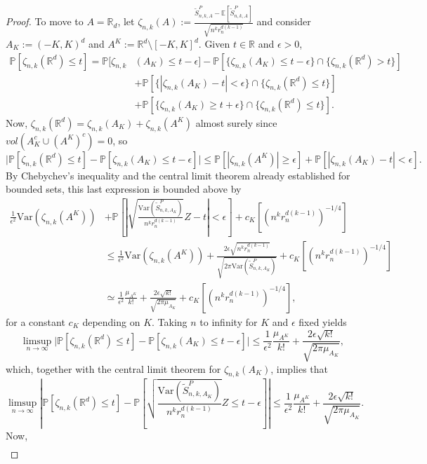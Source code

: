 \documentclass{amsart}
\theoremstyle{definition}
\newcommand{\R}{\mathbb{R}}
\newcommand{\E}{\mathbb{E}}
\renewcommand{\P}{\mathbb{P}}
\newcommand{\var}{\mathrm{Var}}
\newcommand{\s}{\widetilde{S}}
\renewcommand{\1}{\mathbb{1}}
\begin{document}
\begin{proof}
To move to $A=\R_d$, let $\zeta_{n,k}(A):=\frac{\s_{n,k,A}^P
-\E[\s_{n,k,A}^P]}{\sqrt{n^kr_n^{d(k-1)}}}$ and consider $A_K:=(-K,K)^d$
and $A^K:=\R^d\setminus[-K,K]^d.$  Given $t\in\R$ and $\epsilon>0$,
\begin{equation*}\begin{split}
\P[\zeta_{n,k}(\R^d)\le t]=\P[\zeta_{n,k}&(A_K)\le t-\epsilon]-\P[\{\zeta_{n,k}(A_K)
\le t-\epsilon\}\cap\{\zeta_{n,k}(\R^d)>t\}]\\&
+\P[\{|\zeta_{n,k}(A_K)-t|<\epsilon
\}\cap\{\zeta_{n,k}(\R^d)\le t\}]\\&+\P[\{\zeta_{n,k}(A_K)\ge t+\epsilon\}\cap\{
\zeta_{n,k}(\R^d)\le t\}].
\end{split}\end{equation*}
Now, $\zeta_{n,k}(\R^d)=\zeta_{n,k}(A_K)+\zeta_{n,k}(A^K)$ almost surely since
$vol(A_K^c\cup (A^K)^c)=0$, so 
$$\big|\P[\zeta_{n,k}(\R^d)\le t]-\P[\zeta_{n,k}(A_K)\le t-\epsilon]\big|\le
\P[|\zeta_{n,k}(A^K)|\ge\epsilon]+\P[|\zeta_{n,k}(A_K)-t|<\epsilon].$$
By Chebychev's inequality and the central limit theorem already
established for bounded sets, this last expression is bounded above by 
\begin{equation*}\begin{split}
\frac{1}{\epsilon^2}\var(\zeta_{n,k}(A^K))&+
\P\left[\left|\sqrt{\frac{\var(\s_{n,k,A_K}^P)}{n^kr_n^{d(k-1)}}}Z-t\right|<
\epsilon\right]+c_K\left[(n^kr_n^{d(k-1)})^{-1/4}\right]\\&\le
\frac{1}{\epsilon^2}\var(\zeta_{n,k}(A^K))+\frac{2\epsilon\sqrt{
n^kr_n^{d(k-1)}}}{\sqrt{2\pi\var(\s_{n,k,A_K}^P)}}+c_K\left[(n^kr_n^{d(k
-1)})^{-1/4}\right]\\&\simeq \frac{1}{\epsilon^2}\frac{\mu_{A^K}}{k!}
+\frac{2\epsilon\sqrt{k!}}{\sqrt{2\pi\mu_{A_K}}}+c_K\left[(n^kr_n^{d(k
-1)})^{-1/4}\right],
\end{split}\end{equation*}
for a constant $c_K$ depending on $K$.  
Taking $n$ to infinity for $K$ and $\epsilon$ fixed yields
$$\limsup_{n\to\infty}\big|\P[\zeta_{n,k}(\R^d)\le t]-\P[\zeta_{n,k}(A_K)\le 
t-\epsilon]\big|\le \frac{1}{\epsilon^2}\frac{\mu_{A^K}}{k!}
+\frac{2\epsilon\sqrt{k!}}{\sqrt{2\pi\mu_{A_K}}},$$
which, together with  
the central limit theorem for $\zeta_{n,k}(A_K)$, implies that 
$$\limsup_{n\to\infty}\left|\P[\zeta_{n,k}(\R^d)\le t]-\P\left[
\sqrt{\frac{\var(\s_{n,k,A_K}^P)}{n^kr_n^{d(k-1)}}}Z\le 
t-\epsilon\right]\right|\le \frac{1}{\epsilon^2}\frac{\mu_{A^K}}{k!}
+\frac{2\epsilon\sqrt{k!}}{\sqrt{2\pi\mu_{A_K}}}.$$
Now, 
\begin{eqnarray*}

\end{eqnarray*}
\end{proof}
\end{document}
